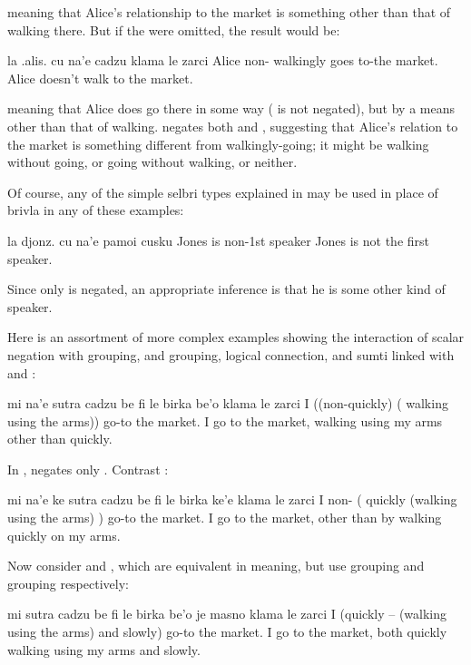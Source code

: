 {\noindent}meaning that Alice's relationship to the market is something
    other than that of walking there. But if the  were
    omitted, the result would be:
\begin{example}
la .alis. cu na'e cadzu klama le zarci\n
Alice non- walkingly goes to-the market.\n
Alice doesn't walk to the market.
\end{example}

{\noindent}meaning that Alice does go there in some way ( is not
    negated), but by a means other than that of walking.  negates both  and
    , suggesting that Alice's relation to the market is
    something different from walkingly-going; it might be walking
    without going, or going without walking, or neither. 

Of course, any of the simple selbri types explained in  may be used in place of brivla in any
    of these examples:
\begin{example}
la djonz. cu na'e pamoi cusku\n
Jones is non-1st speaker\n
Jones is not the first speaker.
\end{example}

Since only  is negated, an appropriate inference is
    that he is some other kind of speaker.

Here is an assortment of more complex examples showing the
    interaction of scalar negation with  grouping,  and
     grouping, logical connection, and sumti linked with
     and :
\begin{example}
mi na'e sutra cadzu be fi le birka be'o\n
\T	klama le zarci\n
I ((non-quickly) ( walking using the arms))\n
\T	go-to the market.\n
I go to the market, walking using my arms\n
\T	other than quickly.
\end{example}

In ,  negates only
    . Contrast :
\begin{example}
mi na'e ke sutra cadzu be fi le birka  ke'e\n
\T	klama le zarci\n
I non- ( quickly (walking using the arms) )\n
\T	go-to the market.\n
I go to the market, other than by walking\n
\T	quickly on my arms.
\end{example}

Now consider  and , which are equivalent in
    meaning, but use  grouping and  grouping
    respectively:
\begin{example}
mi sutra cadzu be fi le birka be'o je masno\n
\T	klama le zarci\n
I (quickly -- (walking using the arms) and slowly)\n
\T	go-to the market.\n
I go to the market, both quickly walking\n
\T	using my arms and slowly.
\end{example}


